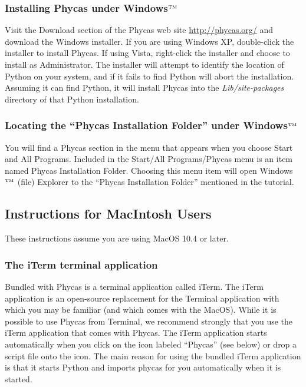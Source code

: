 \documentclass[10pt]{article}
\newcommand{\trademark}[1]{#1${}^{\mbox{\tiny TM}}$}
\newcommand{\pathname}[1]{{\em #1}}				%
\newcommand{\menu}[1]{{\sf #1}}					%
\begin{document}
\subsubsection{Installing Phycas under \trademark{Windows}}

Visit the Download section of the Phycas web site \url{http://phycas.org/} and download the Windows installer. If you are using Windows XP, double-click the installer to install Phycas. If using Vista, right-click the installer and choose to install as Administrator. The installer will attempt to identify the location of Python on your system, and if it fails to find Python will abort the installation. Assuming it can find Python, it will install Phycas into the \pathname{Lib/site-packages} directory of that Python installation. 

\subsubsection{Locating the ``Phycas Installation Folder'' under \trademark{Windows}} \label{subsubsec:installfolderwindows}

You will find a Phycas section in the menu that appears when you choose \menu{Start} and \menu{All Programs}. Included in the \menu{Start/All Programs/Phycas} menu is an item named \menu{Phycas Installation Folder}. Choosing this menu item will open \trademark{Windows} (file) Explorer to the ``Phycas Installation Folder'' mentioned in the tutorial.

\subsection{Instructions for MacIntosh Users}

These instructions assume you are using MacOS 10.4 or later.

\subsubsection{The iTerm terminal application}

Bundled with Phycas is a terminal application called iTerm. The iTerm application is an open-source replacement for the Terminal application with which you may be familiar (and which comes with the MacOS). While it is possible to use Phycas from Terminal, we recommend strongly that you use the iTerm application that comes with Phycas. The iTerm application starts automatically when you click on the icon labeled ``Phycas'' (see below) or drop a script file onto the icon. The main reason for using the bundled iTerm application is that it starts Python and imports phycas for you automatically when it is started.
\end{document}
